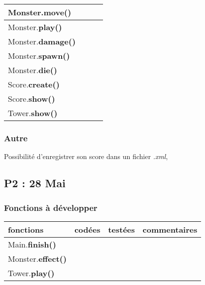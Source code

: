 \documentclass[a4paper]{article}
\begin{document}
\begin{tabular}{|l|c|c|c|}
                \hline
                Monster.\textbf{move()} & & & \\
                \hline
                Monster.\textbf{play()} & & & \\
                \hline
                Monster.\textbf{damage()} & & & \\
                \hline
                Monster.\textbf{spawn()} & & & \\
                \hline
                Monster.\textbf{die()} & & & \\
                \hline
                \hline
                Score.\textbf{create()} & & & \\
                \hline
                Score.\textbf{show()} & & & \\
                \hline
                \hline
                Tower.\textbf{show()} & & & \\
                \hline
      
            \end{tabular}
      
            \subsubsection{Autre}
            Possibilité d'enregistrer son score dans un fichier \emph{.xml},
        \subsection{P2 : 28 Mai}
            \subsubsection{Fonctions à développer}
            \begin{tabular}{|l|c|c|c|}
                \hline
                fonctions & codées & testées & commentaires \\
                \hline
                Main.\textbf{finish()} & & & \\
                \hline
                \hline
                Monster.\textbf{effect()} & & & \\
                \hline
                \hline
                Tower.\textbf{play()} & & & \\
                \hline
            \end{tabular}
\end{document}
